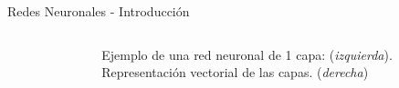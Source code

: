 \documentclass[handout, 9pt]{beamer}
\begin{document}
\begin{frame}{Redes Neuronales - Introducción}
\begin{columns}
\begin{column}{0.5\textwidth}
  \end{column}
  \begin{column}{0.5\textwidth}
  \begin{figure}[H]
  \centering
  \caption{Ejemplo de una red neuronal de 1 capa: (\textit{izquierda}). \\  Representación vectorial de las capas. (\textit{derecha})}
  \label{fig:NN}
  \end{figure}

  \end{column}

\end{columns}

\end{frame}
\end{document}
